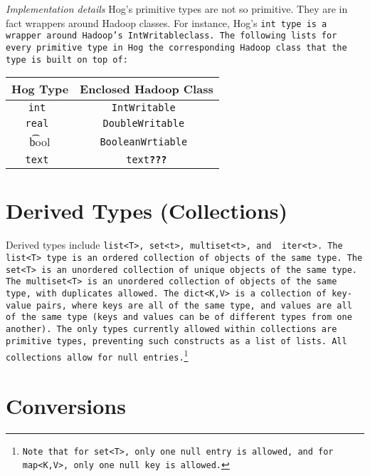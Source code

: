 \documentclass{book}
\begin{document}
\emph{Implementation details} Hog’s primitive types are not so primitive. They are
in fact wrappers around Hadoop classes. For instance, Hog’s \tt int \rm type is a
wrapper around Hadoop's \tt IntWritableclass\rm. The following lists for every
primitive type in Hog the corresponding Hadoop class that the type is built on top
of:

\begin{center}
\begin{tabular}{|c|c|}
    \hline
\textbf{Hog Type} & \textbf{Enclosed Hadoop Class} \\ \hline
\tt int & \tt IntWritable \\ \hline
\tt real & \tt DoubleWritable \\ \hline
\t bool & \tt BooleanWrtiable \\ \hline
\tt text & \tt text\textbf{???}\rm \\ \hline
\end{tabular}
\end{center}


\section{Derived Types (Collections)} %
\label{sec:derived_types_collections_}

Derived types include \tt list<T>\rm, \tt set<t>\rm, \tt multiset<t>\rm, and \tt
iter<t>\rm. The \tt list<T> \rm type is an ordered collection of objects of the
same type. The \tt set<T> \rm is an unordered collection of unique objects of the
same type. The \tt multiset<T> \rm is an unordered collection of objects of the
same type, with duplicates allowed. The \tt dict<K,V> \rm is a collection of
key­value pairs, where keys are all of the same type, and values are all of the
same type (keys and values can be of different types from one another). The only
types currently allowed within collections are primitive types, preventing such
constructs as a list of lists. All collections allow for null
entries.\footnote{Note that for \tt set<T>\rm, only one \tt null \rm entry is
allowed, and for \tt map<K,V>\rm, only one \tt null \rm key is allowed.}


\section{Conversions} %
\label{sec:conversions}
\end{document}

